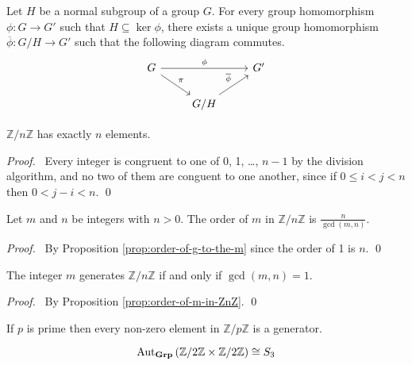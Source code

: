 \begin{cor}
Let $H$ be a normal subgroup of a group $G$. For every group homomorphism $\phi : G \rightarrow G'$ such that $H \subseteq \ker \phi$, there exists a unique group homomorphism $\overline{\phi} : G / H \rightarrow G'$ such that the following diagram commutes.
\[ \begin{tikzcd}
G \arrow[rr,"\phi"]  \arrow[dr,"\pi"] & & G' \\
& G/ H\arrow[ur,"\overline{\phi}"]
\end{tikzcd} \]
\end{cor}

\begin{prop}
    $\mathbb{Z} / n \mathbb{Z}$ has exactly $n$ elements.
\end{prop}

\begin{proof}
    \pf\ Every integer is congruent to one of 0, 1, \ldots, $n - 1$ by the division algorithm, and no two of them are conguent to one another, since if $0 \leq i < j < n$ then $0 < j - i < n$. \qed
\end{proof}

\begin{prop}
    \label{prop:order-of-m-in-ZnZ}
    Let $m$ and $n$ be integers with $n > 0$. The order of $m$ in $\mathbb{Z} / n \mathbb{Z}$ is $\frac{n}{\gcd(m,n)}$.
\end{prop}

\begin{proof}
    \pf\ By Proposition \ref{prop:order-of-g-to-the-m} since the order of 1 is $n$. \qed
\end{proof}

\begin{prop}
    The integer $m$ generates $\mathbb{Z} / n \mathbb{Z}$ if and only if $\gcd(m,n) = 1$.
\end{prop}

\begin{proof}
    \pf\ By Proposition \ref{prop:order-of-m-in-ZnZ}. \qed
\end{proof}

\begin{cor}
    If $p$ is prime then every non-zero element in $\mathbb{Z} / p \mathbb{Z}$ is a generator.
\end{cor}

\begin{prop}
    \[ \mathrm{Aut}_{\mathbf{Grp}} \left( {\mathbb{Z} / 2 \mathbb{Z} \times \mathbb{Z} / 2 \mathbb{Z}} \right) \cong S_3 \]
\end{prop}

